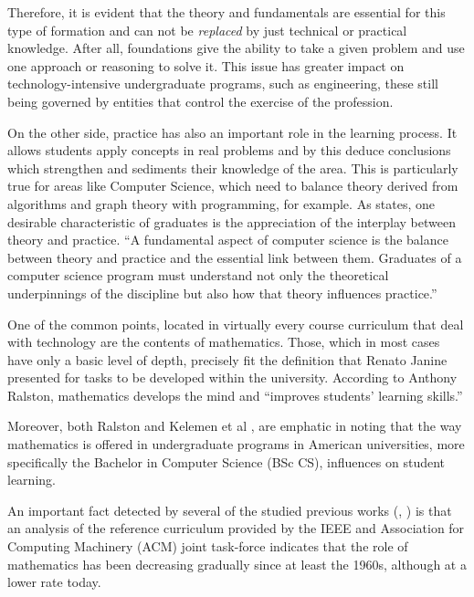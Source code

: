 \documentclass[conference]{IEEEtran}
\begin{document}
	Therefore, it is evident that the theory and fundamentals are essential for this type of formation and can not be \emph{replaced} by just technical or practical knowledge. After all, foundations give the ability to take a given problem and use one approach or reasoning to solve it. This issue has greater impact on technology-intensive undergraduate programs, such as engineering, these still being governed by entities that control the exercise of the profession.

	On the other side, practice has also an important role in the learning process. It allows students apply concepts in real problems and by this deduce conclusions which strengthen and sediments their knowledge of the area. This is particularly true for areas like Computer Science, which need to balance theory derived from algorithms and graph theory with programming, for example. As \cite{cs2008} states, one desirable characteristic of graduates is the appreciation of the interplay between theory and practice. ``A fundamental aspect of computer science is the balance between theory and practice and the essential link between them. Graduates of a computer science program must understand not only the theoretical underpinnings of the discipline but also how that theory influences practice.''

	One of the common points, located in virtually every course curriculum that deal with technology are the contents of mathematics. Those, which in most cases have only a basic level of depth, precisely fit the definition that Renato Janine presented for tasks to be developed within the university. According to Anthony Ralston, mathematics develops the mind and ``improves students' learning skills.'' \cite{ralston:do_need_mathematics}

	Moreover, both Ralston and Kelemen et al \cite{kelemen:has_become_math_phobic}, are emphatic in noting that the way mathematics is offered in undergraduate programs in American universities, more specifically the Bachelor in Computer Science (BSc CS), influences on student learning.

	An important fact detected by several of the studied previous works (\cite{ralston:do_need_mathematics}, \cite{tucker:our_curriculum_math_phobic}) is that an analysis of the reference curriculum provided by the IEEE and Association for Computing Machinery (ACM) joint task-force \cite{cs2001} \cite{cs2008} indicates that the role of mathematics has been decreasing gradually since at least the 1960s, although at a lower rate today.
\end{document}
